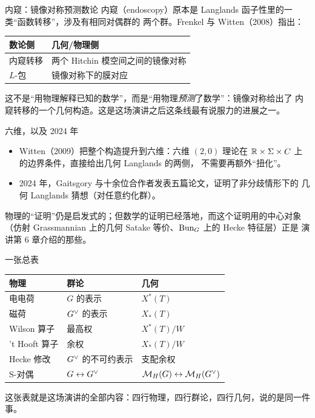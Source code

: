 \begin{frame}{内窥：镜像对称预测数论}
  内窥（endoscopy）原本是 Langlands 函子性里的一类“函数转移”，涉及有相同对偶群的
  两个群。Frenkel 与 Witten（2008）指出：
  \begin{center}
  \begin{tabular}{@{}ll@{}}
    \toprule
    数论侧 & 几何/物理侧 \\
    \midrule
    内窥转移 & 两个 Hitchin 模空间之间的镜像对称 \\
    $L$-包 & 镜像对称下的膜对应 \\
    \bottomrule
  \end{tabular}
  \end{center}
  \vspace{0.4em}
  这不是“用物理解释已知的数学”，而是“用物理\emph{预测}了数学”：镜像对称给出了
  内窥转移的一个几何构造。这是这场演讲之后这条线最有说服力的进展之一。
\end{frame}

\begin{frame}{六维，以及 2024 年}
  \begin{itemize}
    \item Witten（2009）把整个构造提升到六维：六维 $(2,0)$ 理论在
      $\mathbb{R}\times\Sigma\times C$ 上的边界条件，直接给出几何 Langlands 的两侧，
      不需要再额外“扭化”。
    \item 2024 年，Gaitsgory 与十余位合作者发表五篇论文，证明了非分歧情形下的
      几何 Langlands 猜想（对任意约化群）。
  \end{itemize}
  \vspace{0.4em}
  物理的“证明”仍是启发式的；但数学的证明已经落地，而这个证明用的中心对象
  （仿射 Grassmannian 上的几何 Satake 等价、$\mathrm{Bun}_G$ 上的 Hecke 特征层）正是
  演讲第 6 章介绍的那些。
\end{frame}

\begin{frame}{一张总表}
  \begin{center}
  \renewcommand{\arraystretch}{1.2}
  \begin{tabular}{@{}lll@{}}
    \toprule
    物理 & 群论 & 几何 \\
    \midrule
    电电荷 & $G$ 的表示 & $X^*(T)$ \\
    磁荷 & $G^{\vee}$ 的表示 & $X_*(T)$ \\
    Wilson 算子 & 最高权 & $X^*(T)/W$ \\
    't Hooft 算子 & 余权 & $X_*(T)/W$ \\
    Hecke 修改 & $G^{\vee}$ 的不可约表示 & 支配余权 \\
    S-对偶 & $G\leftrightarrow G^{\vee}$ & $\mathcal M_H(G)\leftrightarrow\mathcal M_H(G^{\vee})$ \\
    \bottomrule
  \end{tabular}
  \end{center}
  \vspace{0.3em}
  \begin{center}\small
  这张表就是这场演讲的全部内容：四行物理，四行群论，四行几何，说的是同一件事。
  \end{center}
\end{frame}


